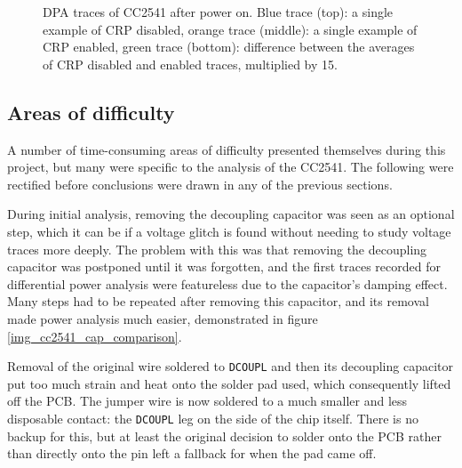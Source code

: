 \begin{figure}
  \begin{center}
    \begin{scalept8}
      \begin{adjustbox}{clip,trim=0cm 0cm 0cm 1cm,min width=\textwidth}
        
      \end{adjustbox}
    \end{scalept8}
  \end{center}
  \caption{DPA traces of CC2541 after power on. Blue trace (top): a single example of CRP disabled, orange trace (middle): a single example of CRP enabled, green trace (bottom): difference between the averages of CRP disabled and enabled traces, multiplied by 15.\label{img_cc2541_coldboot_comparison}}
\end{figure}

\newpage

\hypertarget{areas-of-difficulty}{%
\subsection{Areas of difficulty}\label{areas-of-difficulty}}

A number of time-consuming areas of difficulty presented themselves
during this project, but many were specific to the analysis of the
CC2541. The following were rectified before conclusions were drawn in
any of the previous sections.

During initial analysis, removing the decoupling capacitor was seen as
an optional step, which it can be if a voltage glitch is found without
needing to study voltage traces more deeply. The problem with this was
that removing the decoupling capacitor was postponed until it was
forgotten, and the first traces recorded for differential power analysis
were featureless due to the capacitor's damping effect. Many steps had
to be repeated after removing this capacitor, and its removal made power
analysis much easier, demonstrated in figure
\ref{img_cc2541_cap_comparison}.

Removal of the original wire soldered to \texttt{DCOUPL} and then its
decoupling capacitor put too much strain and heat onto the solder pad
used, which consequently lifted off the PCB. The jumper wire is now
soldered to a much smaller and less disposable contact: the
\texttt{DCOUPL} leg on the side of the chip itself. There is no backup
for this, but at least the original decision to solder onto the PCB
rather than directly onto the pin left a fallback for when the pad came
off.

